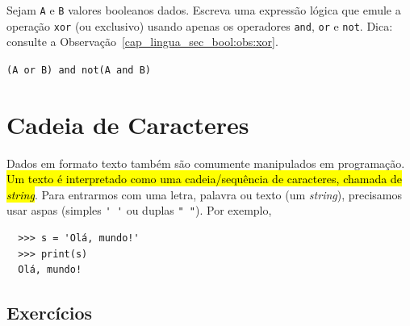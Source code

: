 \begin{exer}\label{cap_lingua_sec_bool:exer:xor}
  Sejam \lstinline+A+ e \lstinline+B+ valores booleanos dados. Escreva uma expressão lógica que emule a operação \lstinline+xor+ (ou exclusivo) usando apenas os operadores \lstinline+and+, \lstinline+or+ e \lstinline+not+. Dica: consulte a Observação~\ref{cap_lingua_sec_bool:obs:xor}.
\end{exer}
\begin{resp}
  \lstinline+(A or B) and not(A and B)+
\end{resp}

\section{Cadeia de Caracteres}\label{cap_lingua_sec_string}

Dados em formato texto também são comumente manipulados em programação. \hl{Um texto é interpretado como uma cadeia/sequência de caracteres, chamada de \emph{\textit{string}}}. Para entrarmos com uma letra, palavra ou texto (um \textit{string}), precisamos usar aspas (simples \lstinline+' '+ ou duplas \lstinline+" "+). Por exemplo,
\begin{lstlisting}
  >>> s = 'Olá, mundo!'
  >>> print(s)
  Olá, mundo!
\end{lstlisting}

\emconstrucao

\subsection{Exercícios}

\emconstrucao